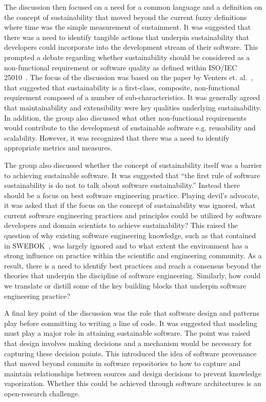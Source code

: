 \documentclass[11pt, oneside]{amsart}
\begin{document}
The discussion then focused on a need for a common language and a definition on the concept of sustainability that moved beyond the current fuzzy definitions where time was the simple measurement of sustainment. It was suggested that there was a need to identify tangible actions that underpin sustainability that developers could incorporate into the development stream of their software. This prompted a debate regarding whether sustainability should be considered as a non-functional requirement or software quality as defined within ISO/IEC 25010~\cite{iso25010}. The focus of the discussion was based on the paper by Venters et. al.~\cite{wssspe2_venters}, that suggested that sustainability is a first-class, composite, non-functional requirement composed of a number of sub-characteristics. It was generally agreed that maintainability and extensibility were key qualities underlying sustainability. In addition, the group also discussed what other non-functional requirements would contribute to the development of sustainable software e.g. reusability and scalability. However, it was recognized that there was a need to identify appropriate metrics and measures.

The group also discussed whether the concept of sustainability itself was a barrier to achieving sustainable software. It was suggested that ``the first rule of software sustainability is do not to talk about software sustainability.'' Instead there should be a focus on best software engineering practice. Playing devil's advocate, it was asked that if the focus on the concept of sustainability was ignored, what current software engineering practices and principles could be utilized by software developers and domain scientists to achieve sustainability? This raised the question of why existing software engineering knowledge, such as that contained in SWEBOK~\cite{Bourque2014}, was largely ignored and to what extent the environment has a strong influence on practice within the scientific and engineering community. As a result, there is a need to identify best practices and reach a consensus beyond the theories that underpin the discipline of software engineering. Similarly, how could we translate or distill some of the key building blocks that underpin software engineering practice?

A final key point of the discussion was the role that software design and patterns play before committing to writing a line of code. It was suggested that modeling must play a major role in attaining sustainable software. The point was raised that design involves making decisions and a mechanism would be necessary for capturing these decision points. This introduced the idea of software provenance that moved beyond commits in software repositories to how to capture and maintain relationships between sources and design decisions to prevent knowledge vaporization. Whether this could be achieved through software architectures is an open-research challenge.
\end{document}
